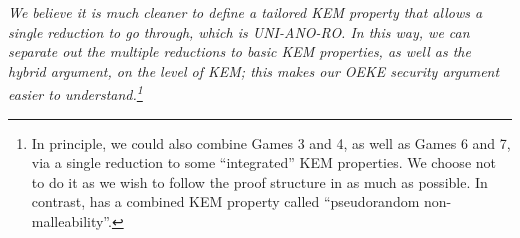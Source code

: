 \documentclass{article}
\theoremstyle{plain}
\theoremstyle{definition}
\theoremstyle{remark}
\begin{document}
\emph{{\color{red}We believe it is much cleaner to define a tailored KEM property that allows a \emph{single} reduction to go through, which is UNI-ANO-RO. In this way, we can separate out the multiple reductions to basic KEM properties, as well as the hybrid argument, on the level of KEM; this makes our OEKE security argument easier to understand.\footnote{In principle, we could also combine Games 3 and 4, as well as Games 6 and 7, via a single reduction to some ``integrated'' KEM properties. We choose not to do it as we wish to follow the proof structure in \cite{EPRINT:ArrBarJar25} as much as possible. In contrast, \cite[Definition~3.6]{EC:JanRoyXu25} has a combined KEM property called ``pseudorandom non-malleability''.}}}
\end{document}
